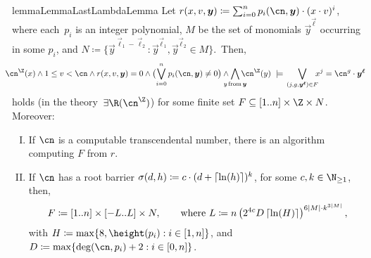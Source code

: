 \begin{restatable}{lemma}{LemmaLastLambdaLemma}
  \label{lemma:last-lambda-lemma}
  Let $r(x,v,\vec y) \coloneqq \sum_{i=0}^n p_i(\cn,\vec y) \cdot (x \cdot v)^i$, where 
  each~$p_i$ is an integer polynomial,
  $M$ be the set of monomials $\vec y^{\vec \ell}$ occurring in some $p_i$, 
  and ${N \coloneqq \{\vec y^{\vec \ell_1 - \vec \ell_2} : \vec y^{\vec \ell_1},\vec y^{\vec \ell_2} \in M\}}$.~Then,%
  \vspace{-3pt}
  \begin{align*}
      \hspace{-10pt}
      \ipow{\cn}(x) 
      \land 1 \leq v < \cn 
      \land r(x,v,\vec y)=0 
      \land \big(\!\bigvee_{i=0}^n p_i(\cn,\vec y) \neq 0\big)
      \land \bigwedge_{\mathclap{y \textup{\,from\,} \vec y}} \ipow{\cn}(y)
      \ \models\ 
      \hspace{-2pt}
      \bigvee_{(j,g,\vec y^{\vec \ell}) \in F}
      \hspace{-5pt}
      x^j = \cn^{g} \cdot \vec y^{\vec \ell}
  \end{align*}
  holds (in the theory~$\exists\R(\ipow{\cn})$) for some finite set $F \subseteq [1..n] \times \Z \times N$.
  Moreover: 
  \begin{enumerate}[I.]
    \item\label{lemma:last-lambda-lemma:i1} If $\cn$ is a computable transcendental number, there is an algorithm computing $F$ from $r$. 
    \item\label{lemma:last-lambda-lemma:i2} If $\cn$ has a root barrier $\sigma(d,h) \coloneqq c \cdot
            (d+\left\lceil\ln(h)\right\rceil)^k$, for some $c,k \in \N_{\geq 1}$, then,
            \begin{equation*}
              F \coloneqq [1..n] \times \left[-L..L\right] \times N,
              \qquad\text{where }
              L \coloneqq n\left(2^{4c}D\left\lceil\ln(H)\right\rceil\right)^{6\left|M\right| \cdot k^{3\left|M\right|}},
            \end{equation*}
              with $H \coloneqq \max\{8,\height(p_i) : i \in [1,n]\}$, 
              and
              $D \coloneqq \max\{\deg(\cn,p_i)+2 : i \in [0,n]\}$.
  \end{enumerate}

\end{restatable}

